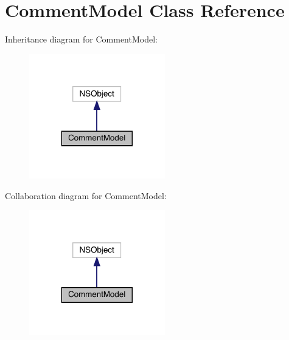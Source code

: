 \hypertarget{interface_comment_model}{}\section{Comment\+Model Class Reference}
\label{interface_comment_model}


Inheritance diagram for Comment\+Model\+:\nopagebreak
\begin{figure}[H]
\begin{center}
\leavevmode
\includegraphics[width=167pt]{interface_comment_model__inherit__graph}
\end{center}
\end{figure}


Collaboration diagram for Comment\+Model\+:\nopagebreak
\begin{figure}[H]
\begin{center}
\leavevmode
\includegraphics[width=167pt]{interface_comment_model__coll__graph}
\end{center}
\end{figure}
